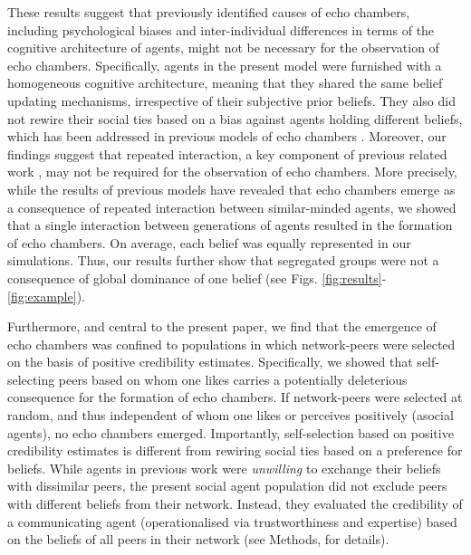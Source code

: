 \documentclass[fleqn,10pt]{wlscirep}
\begin{document}
These results suggest that previously identified causes of echo chambers, including psychological biases and inter-individual differences in terms of the cognitive architecture of agents, might not be necessary for the observation of echo chambers. Specifically, agents in the present model were furnished with a homogeneous cognitive architecture, meaning that they shared the same belief updating mechanisms, irrespective of their subjective prior beliefs. They also did not rewire their social ties based on a bias against agents holding different beliefs, which has been addressed in previous models of echo chambers \cite{henry2011emergence, madsen2018large, sasahara2019inevitability}. Moreover, our findings suggest that repeated interaction, a key component of previous related work \cite{madsen2017growing, madsen2018large}, may not be required for the observation of echo chambers. More precisely, while the results of previous models have revealed that echo chambers emerge as a consequence of repeated interaction between similar-minded agents, we showed that a single interaction between generations of agents resulted in the formation of echo chambers. On average, each belief was equally represented in our simulations. Thus, our results further show that segregated groups were not a consequence of global dominance of one belief (see Figs. \ref{fig:results}-\ref{fig:example}). 

Furthermore, and central to the present paper, we find that the emergence of echo chambers was confined to populations in which network-peers were selected on the basis of positive credibility estimates. Specifically, we showed that self-selecting peers based on whom one likes carries a potentially deleterious consequence for the formation of echo chambers. If network-peers were selected at random, and thus independent of whom one likes or perceives positively (asocial agents), no echo chambers emerged. Importantly, self-selection based on positive credibility estimates is different from rewiring social ties based on a preference for beliefs. While agents in previous work  \cite{henry2011emergence, madsen2018large} were \emph{unwilling} to exchange their beliefs with dissimilar peers, the present social agent population did not exclude peers with different beliefs from their network. Instead, they evaluated the credibility of a communicating agent (operationalised via trustworthiness and expertise) based on the beliefs of all peers in their network (see Methods, for details).
\end{document}
